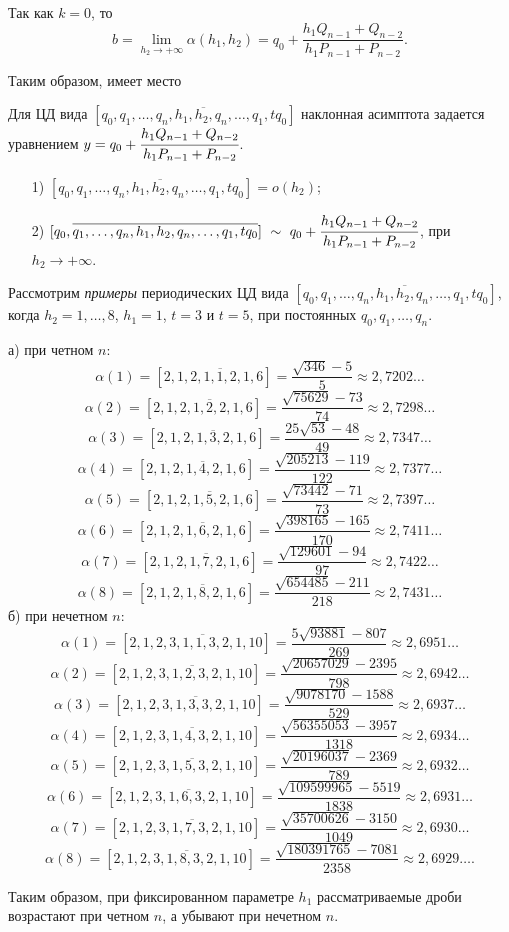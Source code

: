 Так как $k=0$, то \[b=\lim_{{h_2}\to +\infty}\alpha(h_1,h_2)={q_0}+\frac {{h_1}{Q_{n-1}}+{Q_{n-2}}}{{h_1}{P_{n-1}}+{P_{n-2}}}.\]


Таким образом, имеет место
\begin{theoremr}\label{PiskunovaTretyakov:th:9}
Для ЦД вида $[{q_0},\overline{{q_1},\dots,{q_n},{h_{1}},{h_{2}},{q_n},\dots,{q_1},t{q_0}}]$ наклонная асимптота задается уравнением $y={q_0}+\cfrac {{h_1}{Q_{n-1}}+{Q_{n-2}}}{{h_1}{P_{n-1}}+{P_{n-2}}}$.
\end{theoremr}

\begin{corollaryr}
\begin{enumerate}
\item[1) ]$[{q_0},\overline{{q_1},\dots,{q_n},{h_{1}},{h_{2}},{q_n},\dots,{q_1},t{q_0}}]=o(h_{2})$;
\item[2) ]$[{q_0},\overline{{q_1},\dots,{q_n},{h_{1}},{h_{2}},{q_n},\dots,{q_1},t{q_0}}] \ \sim \ {{q_0}+\cfrac {{h_1}{Q_{n-1}}+{Q_{n-2}}}{{h_1}{P_{n-1}}+{P_{n-2}}}}$, при ${{h_{2}}\to +\infty}$.
\end{enumerate}
\end{corollaryr}


Рассмотрим \emph{примеры} периодических ЦД вида $[{q_0},\overline{{q_1},\dots,{q_n},{h_1},{h_2},{q_n},\dots,{q_1},{t{q_0}}}]$,
когда $h_2=1,\dots,8$, ${h_1}=1$, $t=3$ и $t=5$, при постоянных ${q_0},{q_1},\dots,{q_n}.$

\begin{exampler}
а) при четном $n$:
\[\alpha(1)=[2,\overline{1,2,1,1,2,1,6}]=\frac {\sqrt{346}-5}{5}\approx 2,7202\dots\]
\[\alpha(2)=[2,\overline{1,2,1,2,2,1,6}]=\frac {\sqrt{75629}-73}{74}\approx 2,7298\dots\]
\[\alpha(3)=[2,\overline{1,2,1,3,2,1,6}]=\frac {25\sqrt{53}-48}{49}\approx 2,7347\dots\]
\[\alpha(4)=[2,\overline{1,2,1,4,2,1,6}]=\frac {\sqrt{205213}-119}{122}\approx 2,7377\dots\]
\[\alpha(5)=[2,\overline{1,2,1,5,2,1,6}]=\frac {\sqrt{73442}-71}{73}\approx 2,7397\dots\]
\[\alpha(6)=[2,\overline{1,2,1,6,2,1,6}]=\frac {\sqrt{398165}-165}{170}\approx 2,7411\dots\]
\[\alpha(7)=[2,\overline{1,2,1,7,2,1,6}]=\frac {\sqrt{129601}-94}{97}\approx 2,7422\dots\]
\[\alpha(8)=[2,\overline{1,2,1,8,2,1,6}]=\frac {\sqrt{654485}-211}{218}\approx 2,7431\dots\]
б) при нечетном $n$:
\[\alpha(1)=[2,\overline{1,2,3,1,1,3,2,1,10}]=\frac {5\sqrt{93881}-807}{269}\approx 2,6951\dots\]
\[\alpha(2)=[2,\overline{1,2,3,1,2,3,2,1,10}]=\frac {\sqrt{20657029}-2395}{798}\approx 2,6942\dots\]
\[\alpha(3)=[2,\overline{1,2,3,1,3,3,2,1,10}]=\frac {\sqrt{9078170}-1588}{529}\approx 2,6937\dots\]
\[\alpha(4)=[2,\overline{1,2,3,1,4,3,2,1,10}]=\frac {\sqrt{56355053}-3957}{1318}\approx 2,6934\dots\]
\[\alpha(5)=[2,\overline{1,2,3,1,5,3,2,1,10}]=\frac {\sqrt{20196037}-2369}{789}\approx 2,6932\dots\]
\[\alpha(6)=[2,\overline{1,2,3,1,6,3,2,1,10}]=\frac {\sqrt{109599965}-5519}{1838}\approx 2,6931\dots\]
\[\alpha(7)=[2,\overline{1,2,3,1,7,3,2,1,10}]=\frac{\sqrt{35700626}-3150}{1049}\approx 2,6930\dots\]
\[\alpha(8)=[2,\overline{1,2,3,1,8,3,2,1,10}]=\frac {\sqrt{180391765}-7081}{2358}\approx 2,6929\dots.\]
\end{exampler}
Таким образом, при фиксированном параметре $h_1$ рассматриваемые дроби возрастают при четном $n$, а убывают при нечетном $n$.


